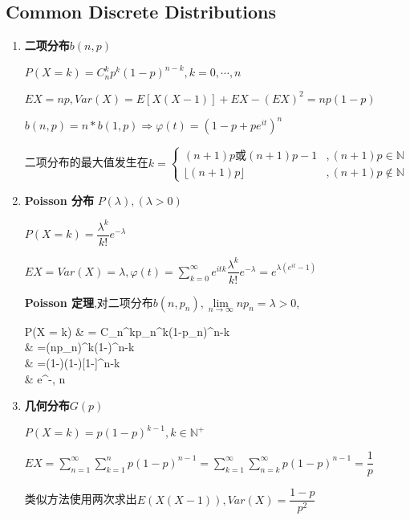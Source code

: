 \subsection{Common Discrete Distributions}
\begin{enumerate}
	\item \textbf{二项分布}$ b(n,p)$

		$ P(X = k) = C_n^kp^k(1-p)^{n-k}, k = 0,\cdots,n$

		$ EX = np, Var(X) = E[X(X-1)]+EX-(EX)^2 = np(1-p)$

		$	b(n,p)  = n * b(1,p)\Rightarrow \varphi(t) = (1-p+pe^{it})^n$

	二项分布的最大值发生在$ k = \left \{ \begin{matrix}
			(n+1)p 或 (n+1)p - 1 &, (n+1)p \in \mathbb{N} \\
			\lfloor(n+1)p\rfloor&,  (n+1)p \not \in \mathbb{N}
		\end{matrix}\right.$

	\item \textbf{Poisson 分布} $ P(\lambda),(\lambda > 0)$

		$ P(X = k) = \dfrac{\lambda^k}{k!}e^{-\lambda}$

		$ EX = Var(X) = \lambda, \varphi(t) = \sum_{k=0}^{\infty}e^{itk}\dfrac{\lambda^k}{k!}e^{-\lambda} = e^{\lambda(e^{it} - 1)}$

		\textbf{Poisson 定理},对二项分布$ b(n,p_n),\lim \limits_{n\to \infty} np_n = \lambda > 0$,
		\begin{flalign*}
			P(X = k) & = C_n^kp_n^k(1-p_n)^{n-k}                                                                                \\
						   & =(np_n)^k(1-)^{n-k}                                     \\
						& =(1-)\cdots(1-)[1-]^{n-k} \\
					 & \rightarrow {}e^{-\lambda}, n\to \infty
		\end{flalign*}

	\item \textbf{几何分布}$ G(p)$

		$ P(X=k) = p(1-p)^{k-1}, k \in \mathbb{N^+}$

		$ EX = \sum_{n=1}^{\infty}\sum_{k=1}^{n}{p(1-p)^{n-1}}=
		\sum_{k=1}^{\infty}\sum_{n=k}^{\infty}{p(1-p)^{n-1}}= \dfrac{1}{p}$

		类似方法使用两次求出$ E(X(X-1)),Var(X) = \dfrac{1-p}{p^2}$


\end{enumerate}

